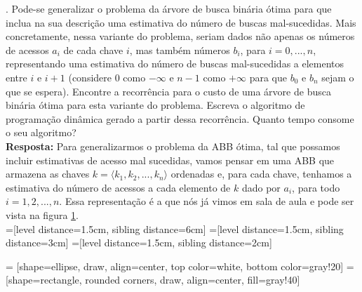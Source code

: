 
. Pode-se generalizar o problema da árvore de busca binária ótima para que inclua na sua descrição uma estimativa do número de buscas mal-sucedidas. Mais concretamente, nessa variante do problema, seriam dados não apenas os números de acessos $a_i$ de cada chave $i$, mas também números $b_i$, para $i = 0, ..., n$, representando uma estimativa do número de buscas mal-sucedidas a elementos entre $i$ e $i+1$ (considere 0 como $-\infty$ e $n-1$ como $+\infty$ para que $b_0$ e $b_n$ sejam o que se espera).
Encontre a recorrência para o custo de uma árvore de busca binária ótima para esta variante do problema. Escreva o algoritmo de programação dinâmica gerado a partir dessa recorrência. Quanto tempo consome o seu algoritmo?\\[6pt]
\textbf{Resposta:} Para generalizarmos o problema da ABB ótima, tal que possamos incluir estimativas de acesso mal sucedidas, vamos pensar em uma ABB que armazena as chaves $k = \langle k_1, k_2, ..., k_n \rangle$ ordenadas e, para cada chave, tenhamos a estimativa do número de acessos a cada elemento de $k$ dado por $a_i$, para todo $i = 1, 2, ..., n$. Essa representação é a que nós já vimos em sala de aula e pode ser vista na figura \ref{fig:6.8-1}.\\

=[level distance=1.5cm, sibling distance=6cm]
=[level distance=1.5cm, sibling distance=3cm]
=[level distance=1.5cm, sibling distance=2cm]

 = [shape=ellipse, draw, align=center,
                   top color=white, bottom color=gray!20]
 = [shape=rectangle, rounded corners, draw, align=center, fill=gray!40]

\begin{figure}[!h]
\centering
{}
\label{fig:6.8-1}
\end{figure}

